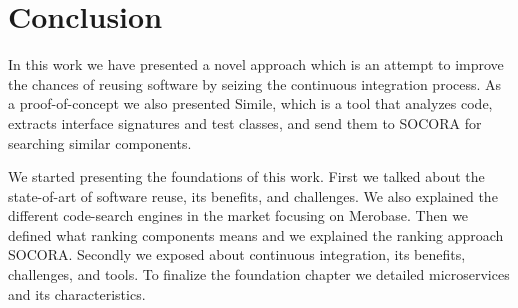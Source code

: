 \chapter{Conclusion}
\label{conclusion}
In this work we have presented a novel approach which is an attempt to improve the chances of reusing software by seizing the continuous integration process. As a proof-of-concept we also presented Simile, which is a tool that analyzes code, extracts interface signatures and test classes, and send them to SOCORA for searching similar components.

We started presenting the foundations of this work. First we talked about the state-of-art of software reuse, its benefits, and challenges. We also explained the different code-search engines in the market focusing on Merobase. Then we defined what ranking components means and we explained the ranking approach SOCORA. Secondly we exposed about continuous integration, its benefits, challenges, and tools. To finalize the foundation chapter we detailed microservices and its characteristics.

